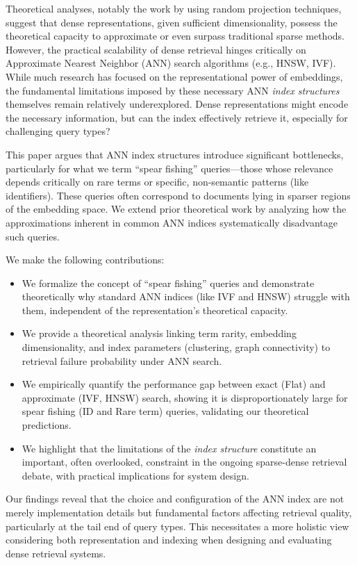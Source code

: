 \documentclass[manuscript]{acmart}
\begin{document}
Theoretical analyses, notably the work by \citet{tay2020sparse} using random projection techniques, suggest that dense representations, given sufficient dimensionality, possess the theoretical capacity to approximate or even surpass traditional sparse methods. However, the practical scalability of dense retrieval hinges critically on Approximate Nearest Neighbor (ANN) search algorithms (e.g., HNSW, IVF). While much research has focused on the representational power of embeddings, the fundamental limitations imposed by these necessary ANN \textit{index structures} themselves remain relatively underexplored. Dense representations might encode the necessary information, but can the index effectively retrieve it, especially for challenging query types?

This paper argues that ANN index structures introduce significant bottlenecks, particularly for what we term ``spear fishing'' queries—those whose relevance depends critically on rare terms or specific, non-semantic patterns (like identifiers). These queries often correspond to documents lying in sparser regions of the embedding space. We extend prior theoretical work \cite{tay2020sparse, fan2022information} by analyzing how the approximations inherent in common ANN indices systematically disadvantage such queries.

We make the following contributions:
\begin{itemize}
    \item We formalize the concept of ``spear fishing'' queries and demonstrate theoretically why standard ANN indices (like IVF and HNSW) struggle with them, independent of the representation's theoretical capacity.
    \item We provide a theoretical analysis linking term rarity, embedding dimensionality, and index parameters (clustering, graph connectivity) to retrieval failure probability under ANN search.
    \item We empirically quantify the performance gap between exact (Flat) and approximate (IVF, HNSW) search, showing it is disproportionately large for spear fishing (ID and Rare term) queries, validating our theoretical predictions.
    \item We highlight that the limitations of the \textit{index structure} constitute an important, often overlooked, constraint in the ongoing sparse-dense retrieval debate, with practical implications for system design.
\end{itemize}

Our findings reveal that the choice and configuration of the ANN index are not merely implementation details but fundamental factors affecting retrieval quality, particularly at the tail end of query types. This necessitates a more holistic view considering both representation and indexing when designing and evaluating dense retrieval systems.
\end{document}
